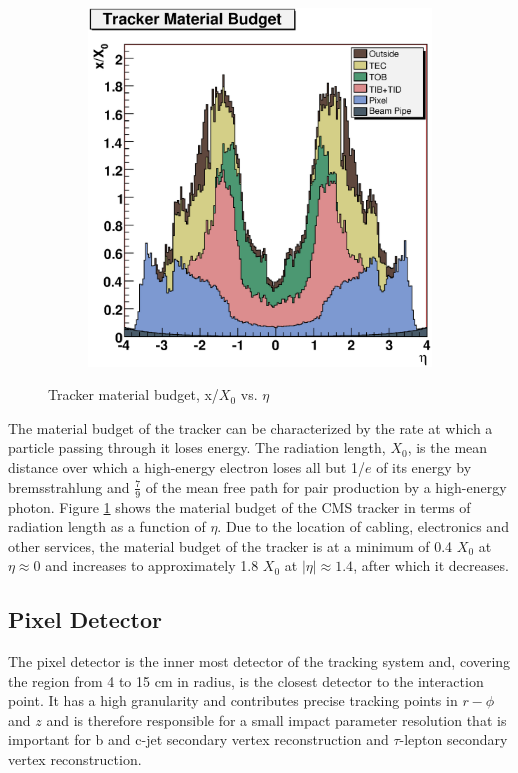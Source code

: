 \begin{figure}[hb]
\begin{subfigure}[b]{.45\textwidth}
	\includegraphics[width=\textwidth]{images/Tracker_SubDetectors_x_vs_eta.eps}
    \end{subfigure}	
  	\caption[Tracker Material Budget]
   	{Tracker material budget, x/$X_{0}$ vs. $\eta$}
	\label{fig:trackerMaterial}
\end{figure}

The material budget of the tracker can be characterized by the rate at which a particle
passing through it loses energy. The radiation length, $X_{0}$, is the 
mean distance over which a high-energy electron loses all but 1/$e$ 
of its energy by bremsstrahlung %
and $\frac{7}{9}$ of the mean free path for pair production by 
a high-energy photon. Figure \ref{fig:trackerMaterial}
shows the material budget of the CMS tracker in terms of radiation length as a function of $\eta$. 
Due to the location of cabling, electronics and other services, the material budget of the 
tracker is at a minimum of 0.4 $X_{0}$ at $\eta \approx 0$ and increases to approximately 1.8 $X_{0}$
at $|\eta| \approx 1.4$, after which it decreases. 

\subsection{Pixel Detector}%
The pixel detector is the inner most detector of the tracking system and,
covering the region from 4 to 15 cm in radius, is the closest detector to 
the interaction point. It has a high granularity and contributes precise 
tracking points in $r-\phi$ and $z$ and is therefore responsible for a small impact 
parameter resolution that is important for b and c-jet secondary
vertex reconstruction and $\tau$-lepton secondary vertex reconstruction.


